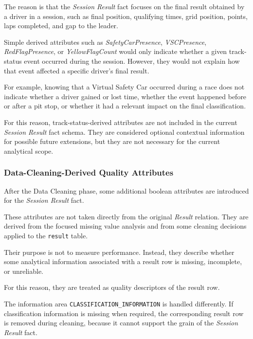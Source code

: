 \documentclass[a4paper,11pt]{article}
\begin{document}
	The reason is that the \textit{Session Result} fact focuses on the final result obtained by
	a driver in a session, such as final position, qualifying times, grid position, points, laps
	completed, and gap to the leader.
	
	Simple derived attributes such as \textit{SafetyCarPresence}, \textit{VSCPresence},
	\textit{RedFlagPresence}, or \textit{YellowFlagCount} would only indicate whether a given
	track-status event occurred during the session. However, they would not explain how that
	event affected a specific driver's final result.
	
	For example, knowing that a Virtual Safety Car occurred during a race does not indicate
	whether a driver gained or lost time, whether the event happened before or after a pit
	stop, or whether it had a relevant impact on the final classification.
	
	For this reason, track-status-derived attributes are not included in the current
	\textit{Session Result} fact schema. They are considered optional contextual information
	for possible future extensions, but they are not necessary for the current analytical scope.

	
	\subsubsection{Data-Cleaning-Derived Quality Attributes}
	
	After the Data Cleaning phase, some additional boolean attributes are introduced for the
	\textit{Session Result} fact.
	
	These attributes are not taken directly from the original \textit{Result} relation.
	They are derived from the focused missing value analysis and from some cleaning decisions
	applied to the \texttt{result} table.
	
	Their purpose is not to measure performance.
	Instead, they describe whether some analytical information associated with a result row is
	missing, incomplete, or unreliable.
	
	For this reason, they are treated as quality descriptors of the result row.
	
	The information area \texttt{CLASSIFICATION\_INFORMATION} is handled differently.
	If classification information is missing when required, the corresponding result row is
	removed during cleaning, because it cannot support the grain of the \textit{Session Result}
	fact.
	
\end{document}
